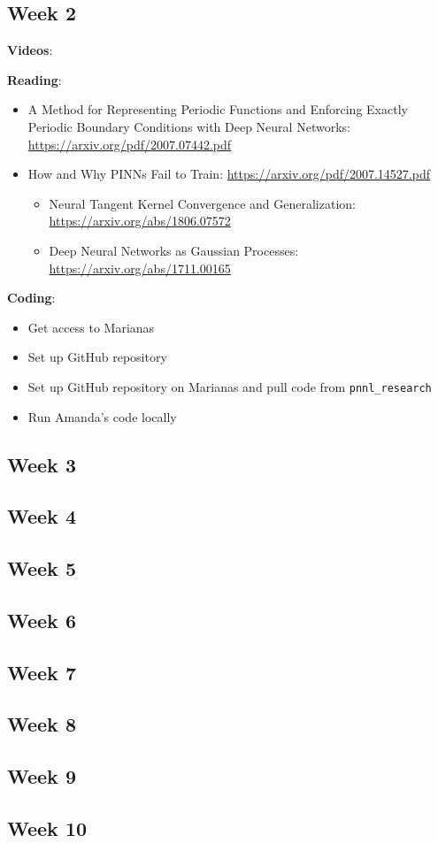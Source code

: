 \documentclass{article}
\def\bf{\textbf}
\begin{document}
\subsection*{Week 2}
\bf{Videos}:

\bf{Reading}:
\begin{itemize}
	\item A Method for Representing Periodic Functions and Enforcing Exactly Periodic Boundary Conditions with Deep Neural Networks: \url{https://arxiv.org/pdf/2007.07442.pdf}
	\item How and Why PINNs Fail to Train: \url{https://arxiv.org/pdf/2007.14527.pdf}
	\begin{itemize}
		\item Neural Tangent Kernel Convergence and Generalization: \url{https://arxiv.org/abs/1806.07572}
		\item Deep Neural Networks as Gaussian Processes: \url{https://arxiv.org/abs/1711.00165}
	\end{itemize}
\end{itemize}
\bf{Coding}:
\begin{itemize}
\item Get access to Marianas
\item Set up GitHub repository
\item Set up GitHub repository on Marianas and pull code from \verb|pnnl_research|
\item Run Amanda's code locally
\end{itemize}

\subsection*{Week 3} 
\subsection*{Week 4} 
\subsection*{Week 5} 
\subsection*{Week 6} 
\subsection*{Week 7} 
\subsection*{Week 8} 
\subsection*{Week 9}
\subsection*{Week 10}  
\end{document}
